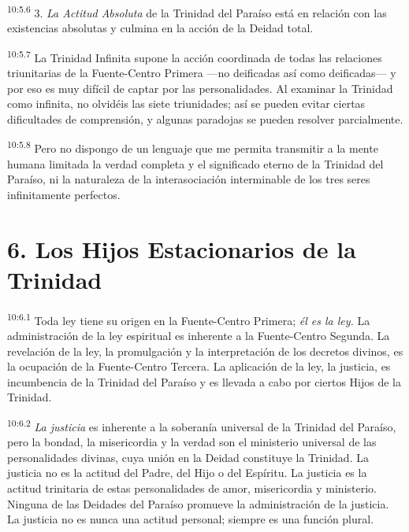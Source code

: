 \par
\textsuperscript{10:5.6} 3. \textit{La Actitud Absoluta} de la Trinidad del Paraíso está en relación con las existencias absolutas y culmina en la acción de la Deidad total.

\par
\textsuperscript{10:5.7} La Trinidad Infinita supone la acción coordinada de todas las relaciones triunitarias de la Fuente-Centro Primera ---no deificadas así como deificadas--- y por eso es muy difícil de captar por las personalidades. Al examinar la Trinidad como infinita, no olvidéis las siete triunidades; así se pueden evitar ciertas dificultades de comprensión, y algunas paradojas se pueden resolver parcialmente.

\par
\textsuperscript{10:5.8} Pero no dispongo de un lenguaje que me permita transmitir a la mente humana limitada la verdad completa y el significado eterno de la Trinidad del Paraíso, ni la naturaleza de la interasociación interminable de los tres seres infinitamente perfectos.

\section*{6. Los Hijos Estacionarios de la Trinidad}
\par
\textsuperscript{10:6.1} Toda ley tiene su origen en la Fuente-Centro Primera; \textit{él es la ley.} La administración de la ley espiritual es inherente a la Fuente-Centro Segunda. La revelación de la ley, la promulgación y la interpretación de los decretos divinos, es la ocupación de la Fuente-Centro Tercera. La aplicación de la ley, la justicia, es incumbencia de la Trinidad del Paraíso y es llevada a cabo por ciertos Hijos de la Trinidad.

\par
\textsuperscript{10:6.2} \textit{La justicia} es inherente a la soberanía universal de la Trinidad del Paraíso, pero la bondad, la misericordia y la verdad son el ministerio universal de las personalidades divinas, cuya unión en la Deidad constituye la Trinidad. La justicia no es la actitud del Padre, del Hijo o del Espíritu. La justicia es la actitud trinitaria de estas personalidades de amor, misericordia y ministerio. Ninguna de las Deidades del Paraíso promueve la administración de la justicia. La justicia no es nunca una actitud personal; siempre es una función plural.

